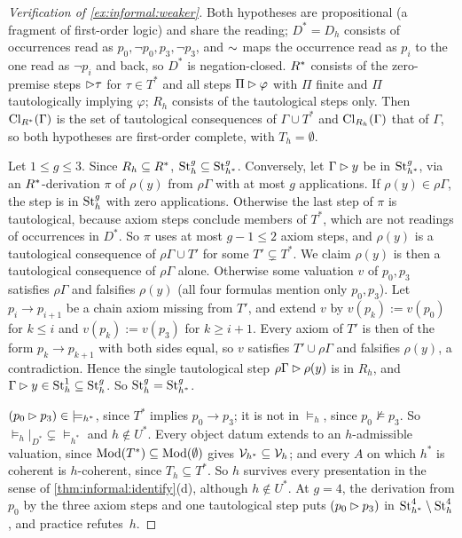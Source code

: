\begin{proof}[Verification of \cref{ex:informal:weaker}]
Both hypotheses are propositional (a fragment of first-order logic) and share the reading; $D^*=D_h$ consists of occurrences read as $p_0,\neg p_0,p_3,\neg p_3$, and ${\sim}$ maps the occurrence read as $p_i$ to the one read as $\neg p_i$ and back, so $D^*$ is negation-closed. $R^{*}$ consists of the zero-premise steps $\rhd\tau$ for $\tau\in T^*$ and all steps $\Pi\rhd\varphi$ with $\Pi$ finite and $\Pi$ tautologically implying $\varphi$; $R_h$ consists of the tautological steps only. Then $\mathrm{Cl}_{R^{*}}(\Gamma)$ is the set of tautological consequences of $\Gamma\cup T^*$ and $\mathrm{Cl}_{R_h}(\Gamma)$ that of $\Gamma$, so both hypotheses are first-order complete, with $T_h=\emptyset$.

Let $1\le g\le3$. Since $R_h\subseteq R^{*}$, $\mathrm{St}^{g}_{h}\subseteq\mathrm{St}^{g}_{h^*}$. Conversely, let $\Gamma\rhd y$ be in $\mathrm{St}^{g}_{h^*}$, via an $R^{*}$-derivation $\pi$ of $\rho(y)$ from $\rho\Gamma$ with at most $g$ applications. If $\rho(y)\in\rho\Gamma$, the step is in $\mathrm{St}^{g}_{h}$ with zero applications. Otherwise the last step of $\pi$ is tautological, because axiom steps conclude members of $T^*$, which are not readings of occurrences in $D^*$. So $\pi$ uses at most $g-1\le2$ axiom steps, and $\rho(y)$ is a tautological consequence of $\rho\Gamma\cup T'$ for some $T'\subsetneq T^*$. We claim $\rho(y)$ is then a tautological consequence of $\rho\Gamma$ alone. Otherwise some valuation $v$ of $p_0,p_3$ satisfies $\rho\Gamma$ and falsifies $\rho(y)$ (all four formulas mention only $p_0,p_3$). Let $p_i\to p_{i+1}$ be a chain axiom missing from $T'$, and extend $v$ by $v(p_k):=v(p_0)$ for $k\le i$ and $v(p_k):=v(p_3)$ for $k\ge i+1$. Every axiom of $T'$ is then of the form $p_k\to p_{k+1}$ with both sides equal, so $v$ satisfies $T'\cup\rho\Gamma$ and falsifies $\rho(y)$, a contradiction. Hence the single tautological step $\rho\Gamma\rhd\rho(y)$ is in $R_h$, and $\Gamma\rhd y\in\mathrm{St}^{1}_{h}\subseteq\mathrm{St}^{g}_{h}$. So $\mathrm{St}^{g}_{h}=\mathrm{St}^{g}_{h^*}$.

$(p_0\rhd p_3)\in{\models_{h^*}}$, since $T^*$ implies $p_0\to p_3$; it is not in ${\models_h}$, since $p_0\not\models p_3$. So ${\models_h}|_{D^*}\subsetneq{\models_{h^*}}$ and $h\notin U^*$. Every object datum extends to an $h$-admissible valuation, since $\mathrm{Mod}(T^*)\subseteq\mathrm{Mod}(\emptyset)$ gives $\mathcal V_{h^*}\subseteq\mathcal V_{h}$; and every $A$ on which $h^*$ is coherent is $h$-coherent, since $T_h\subseteq T^*$. So $h$ survives every presentation in the sense of \cref{thm:informal:identify}(d), although $h\notin U^*$. At $g=4$, the derivation from $p_0$ by the three axiom steps and one tautological step puts $(p_0\rhd p_3)$ in $\mathrm{St}^{4}_{h^*}\setminus\mathrm{St}^{4}_{h}$, and practice refutes~$h$.
\end{proof}


